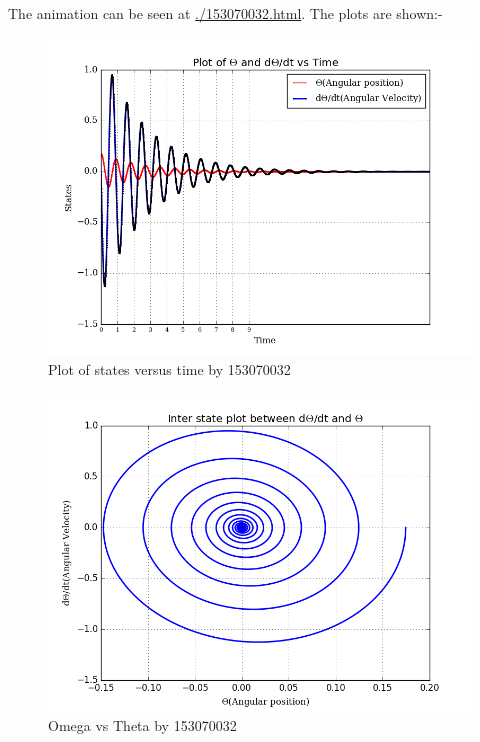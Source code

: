 \documentclass[a4paper]{article}
\begin{document}
The animation can be seen at \url{./153070032.html}. The plots are shown:-
\begin{figure}[H]
    \centering
    \includegraphics[scale=0.5]{fig(1).png}
    \caption{Plot of states versus time by 153070032}
\end{figure}
\begin{figure}[H]
    \centering
    \includegraphics[scale=0.5]{fig(2).png}
    \caption{Omega vs Theta by 153070032}
\end{figure}


\end{document}
